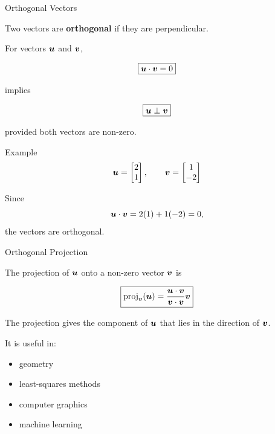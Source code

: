 \begin{frame}{Orthogonal Vectors}

Two vectors are \textbf{orthogonal} if they are perpendicular.

For vectors $\bm{u}$ and $\bm{v}$,

\vspace{-0.5cm}
\[
\boxed{
\bm{u}\cdot\bm{v}=0
}
\]

implies

\vspace{-0.5cm}
\[
\boxed{
\bm{u}\perp\bm{v}
}
\]

provided both vectors are non-zero.

\begin{exampleblock}{Example}
\[
\bm{u}
=
\begin{bmatrix}
2\\
1
\end{bmatrix},
\qquad
\bm{v}
=
\begin{bmatrix}
1\\
-2
\end{bmatrix}
\]

\vspace{-0.2cm}

Since
\[
\bm{u}\cdot\bm{v}
=
2(1)+1(-2)=0,
\]
the vectors are orthogonal.

\end{exampleblock}

\end{frame}



\begin{frame}{Orthogonal Projection}

The projection of $\bm{u}$ onto a non-zero vector $\bm{v}$ is

\[
\boxed{
\operatorname{proj}_{\bm{v}}(\bm{u})
=
\frac{
\bm{u}\cdot\bm{v}
}{
\bm{v}\cdot\bm{v}
}
\bm{v}
}
\]

\vspace{0.5cm}

The projection gives the component of $\bm{u}$ that lies in the direction of $\bm{v}$.

\vspace{0.3cm}

It is useful in:

\begin{itemize}
    \item geometry
    \item least-squares methods
    \item computer graphics
    \item machine learning
\end{itemize}

\end{frame}


